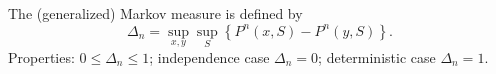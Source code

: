 The (generalized) Markov measure is defined by
$$\Delta_n = \sup_{x,y} \sup_S \left\{ P^n(x, S) - P^n(y, S) \right\}.$$
Properties: $0 \leq \Delta_n \leq 1$; independence case $\Delta_n = 0$; deterministic case $\Delta_n = 1$.
